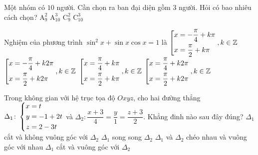 \begin{ex}%
Một nhóm có $10$ người. Cần chọn ra ban đại diện gồm $3$ người. Hỏi có bao nhiêu cách chọn?
\choice
{$\mathrm{A}_9^2$}
{$\mathrm{A}_{10}^3$}
{$\mathrm{C}_9^2$}
{\True $\mathrm{C}_{10}^3$}	
\end{ex}

\begin{ex}%
Nghiệm của phương trình $\sin ^2 x + \sin x \cos x =1$ là
\choice
{$\left[\begin{aligned}x&=-\dfrac{\pi}{4}+k \pi\\x&=\dfrac{\pi}{2}+k \pi\end{aligned}\right., k \in \mathbb{Z}$}
{$\left[\begin{aligned}x&=-\dfrac{\pi}{4}+k 2\pi\\x&=\dfrac{\pi}{2}+k 2\pi\end{aligned}\right., k \in \mathbb{Z}$}
{\True $\left[\begin{aligned}x&=\dfrac{\pi}{4}+k \pi\\x&=\dfrac{\pi}{2}+k \pi\end{aligned}\right., k \in \mathbb{Z}$}
{$\left[\begin{aligned}x&=\dfrac{\pi}{4}+k2 \pi\\x&=\dfrac{\pi}{2}+k 2\pi\end{aligned}\right., k \in \mathbb{Z}$}
\end{ex}

\begin{ex}%
Trong không gian với hệ trục tọa độ $Oxyz$, cho hai đường thẳng $\Delta _1\colon \left\{\begin{aligned}x&=t\\y&=-1+2t\\z&=2-3t\end{aligned}\right.$ và $\Delta_2\colon \dfrac{x+3}{4}=\dfrac{y}{1}=\dfrac{z+3}{2}$. Khẳng đinh nào sau đây đúng?
\choice
{$\Delta_1$ cắt và không vuông góc với $\Delta_2$}
{$\Delta_1$ song song $\Delta_2$}
{$\Delta_1$ và $\Delta_2$ chéo nhau và vuông góc với nhau}
{\True $\Delta_1$ cắt và vuông góc với $\Delta_2$}
\end{ex}

